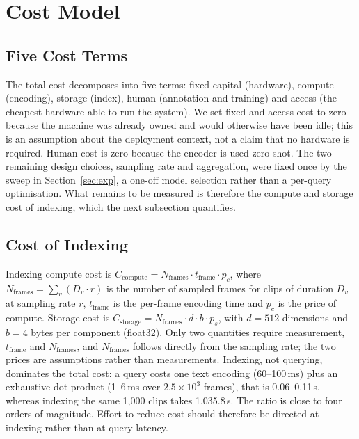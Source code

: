 \documentclass[journal]{IEEEtran}
\begin{document}
\section{Cost Model}\label{sec:cost}

\subsection{Five Cost Terms}
The total cost decomposes into five terms: fixed capital (hardware), compute (encoding), storage
(index), human (annotation and training) and access (the cheapest hardware able to run the system).
We set fixed and access cost to zero because the machine was already owned and would otherwise
have been idle; this is an assumption about the deployment context, not a claim that no hardware
is required. Human cost is zero because the encoder is used zero-shot. The two remaining
design choices, sampling rate and aggregation, were fixed once by the sweep in
Section~\ref{sec:exp}, a one-off model selection rather than a per-query optimisation. What remains
to be measured is therefore the compute and storage cost of indexing, which the next subsection
quantifies.

\subsection{Cost of Indexing}
Indexing compute cost is $C_{\text{compute}} = N_{\text{frames}} \cdot t_{\text{frame}} \cdot
p_c$, where $N_{\text{frames}} = \sum_v (D_v \cdot r)$ is the number of sampled frames for
clips of duration $D_v$ at sampling rate $r$, $t_{\text{frame}}$ is the per-frame encoding time
and $p_c$ is the price of compute. Storage cost is $C_{\text{storage}} = N_{\text{frames}} \cdot
d \cdot b \cdot p_s$, with $d=512$ dimensions and $b=4$ bytes per component (float32). Only two
quantities require measurement, $t_{\text{frame}}$ and $N_{\text{frames}}$, and
$N_{\text{frames}}$ follows directly from the sampling rate; the two prices are assumptions
rather than measurements. Indexing, not querying, dominates the total cost: a query costs one
text encoding (60--100\,ms) plus an exhaustive dot product (1--6\,ms over
$2.5\times10^{3}$ frames), that is 0.06--0.11\,s, whereas indexing the same 1{,}000 clips takes
1{,}035.8\,s. The ratio is close to four orders of magnitude. Effort to reduce cost should
therefore be directed at indexing rather than at query latency.
\end{document}
